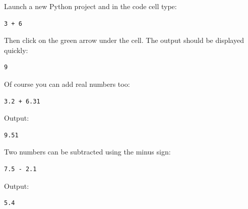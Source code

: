 \documentclass[article,A4,12pt]{llncs}
\begin{document}
Launch a new Python project and in the code cell type:\\

\begin{bbox}
\begin{verbatim}
3 + 6
\end{verbatim}
\end{bbox}
\vspace{6mm}

\noindent
Then click on the green arrow under the cell. The output should be displayed quickly:\\

\begin{ybox}
\begin{verbatim}
9
\end{verbatim}
\end{ybox}
\vspace{6mm}

\noindent
Of course you can add real numbers too:\\

\begin{bbox}
\begin{verbatim}
3.2 + 6.31
\end{verbatim}
\end{bbox}
\vspace{6mm}

\noindent
Output:\\

\begin{ybox}
\begin{verbatim}
9.51
\end{verbatim}
\end{ybox}
\vspace{6mm}

\noindent
Two numbers can be subtracted using the minus sign:\\

\begin{bbox}
\begin{verbatim}
7.5 - 2.1
\end{verbatim}
\end{bbox}
\vspace{6mm}

\noindent
Output:\\

\begin{ybox}
\begin{verbatim}
5.4
\end{verbatim}
\end{ybox}
\vspace{6mm}
\end{document}
